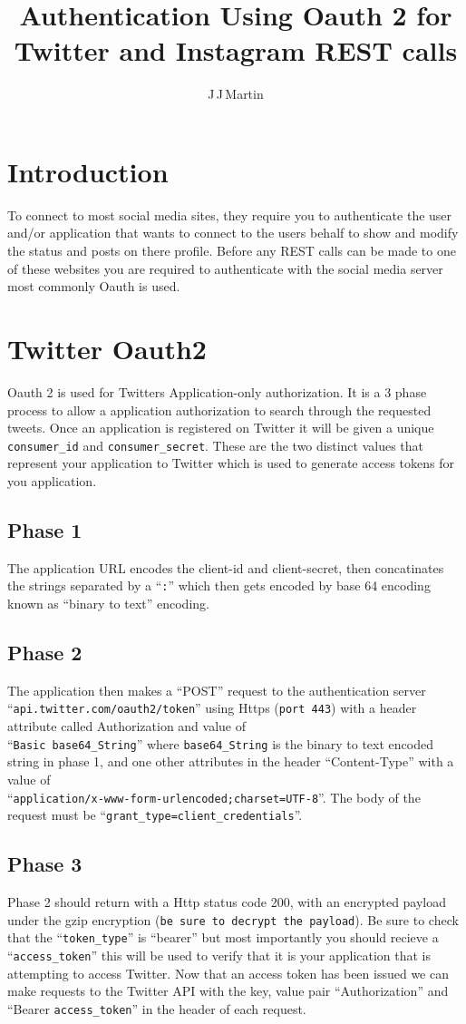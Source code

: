 \documentclass{article}
\title{Authentication Using Oauth 2 for Twitter and Instagram REST calls}
\author{J\,J\,Martin}
\begin{document}
\maketitle
\section{Introduction}
To connect to most social media sites, they require you to authenticate the user and/or application that wants to connect to the users behalf to show and modify the status and posts on there profile. Before any REST calls can be made to one of these websites you are required to authenticate with the social media server most commonly Oauth is used. 
\section{Twitter Oauth2}
Oauth 2 is used for Twitters Application-only authorization. It is a 3 phase process to allow a application authorization to search through the requested tweets. Once an application is registered on Twitter it will be given a unique \verb+consumer_id+ and \verb+consumer_secret+. These are the two distinct values that represent your application to Twitter which is used to generate access tokens for you application.
\subsection{Phase 1}
The application URL encodes the client-id and client-secret, then concatinates the strings separated by a ``\verb+:+'' which then gets encoded by base 64 encoding known as ``binary to text'' encoding.
\subsection{Phase 2}
The application then makes a ``POST'' request to the authentication server ``\verb+api.twitter.com/oauth2/token+'' using Https (\verb+port 443+) with a header attribute called Authorization and value of \\``\verb+Basic base64_String+'' where \verb+base64_String+ is the binary to text encoded string in phase 1, and one other attributes in the header ``Content-Type'' with a value of \\``\verb+application/x-www-form-urlencoded;charset=UTF-8+''. The body of the request must be  ``\verb+grant_type=client_credentials+''.
\subsection{Phase 3}
Phase 2 should return with a Http status code 200, with an encrypted payload under the gzip encryption (\verb+be sure to decrypt the payload+). Be sure to check that the ``\verb+token_type+'' is ``bearer'' but most importantly you should recieve a ``\verb+access_token+'' this will be used to verify that it is your application that is attempting to access Twitter. Now that an access token has been issued we can make requests to the Twitter API with the key, value pair ``Authorization'' and ``Bearer \verb+access_token+'' in the header of each request.
\end{document}
